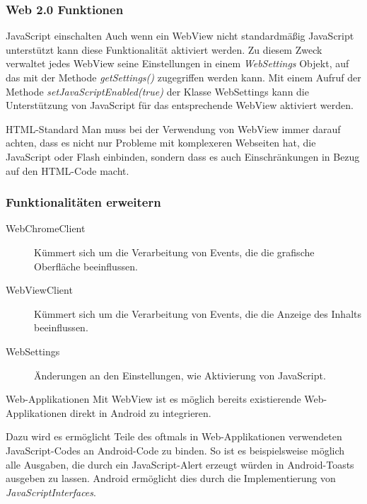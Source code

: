 \begin{frame}
   \frametitle{Web 2.0 Funktionen}
   \begin{alertblock}{JavaScript einschalten}
      Auch wenn ein WebView nicht standardmäßig JavaScript unterstützt kann diese 
      Funktionalität aktiviert werden. Zu diesem Zweck verwaltet jedes WebView 
      seine Einstellungen in einem \emph{WebSettings} Objekt, auf das mit der 
      Methode \emph{getSettings()} zugegriffen werden kann. Mit einem Aufruf 
      der Methode \emph{setJavaScriptEnabled(true)} der Klasse WebSettings 
      kann die Unterstützung von JavaScript für das entsprechende WebView aktiviert werden.
   \end{alertblock}

   \begin{alertblock}{HTML-Standard}
      Man muss bei der Verwendung von WebView immer darauf achten, dass es nicht 
      nur Probleme mit komplexeren Webseiten hat, die JavaScript oder Flash einbinden, 
      sondern dass es auch Einschränkungen in Bezug auf den HTML-Code macht.
   \end{alertblock}
\end{frame}

\begin{frame}
   \frametitle{Funktionalitäten erweitern}
   \begin{description}
      \item[WebChromeClient] Kümmert sich um die Verarbeitung von Events, die die 
         grafische Oberfläche beeinflussen.
      \item[WebViewClient]  Kümmert sich um die Verarbeitung von Events, die die 
         Anzeige des Inhalts beeinflussen.
      \item[WebSettings] Änderungen an den Einstellungen, wie Aktivierung von JavaScript.
   \end{description}

   \begin{alertblock}{Web-Applikationen}
      Mit WebView ist es möglich bereits existierende Web-Applikationen direkt 
      in Android zu integrieren.

      \vspace{5mm}

      Dazu wird es ermöglicht Teile des oftmals in Web-Applikationen verwendeten 
      JavaScript-Codes an Android-Code zu binden. So ist es beispielsweise möglich 
      alle Ausgaben, die durch ein JavaScript-Alert erzeugt würden in Android-Toasts 
      ausgeben zu lassen. Android ermöglicht dies durch die Implementierung 
      von \emph{JavaScriptInterfaces}.
   \end{alertblock}
\end{frame}

